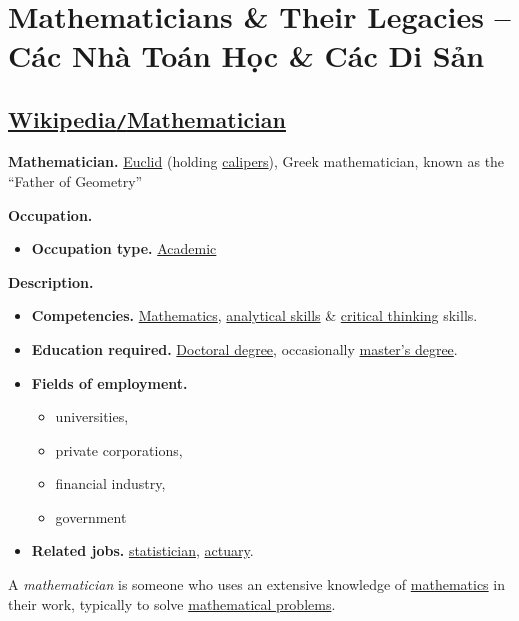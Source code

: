 \documentclass{article}
\begin{document}

\section{Mathematicians \& Their Legacies -- Các Nhà Toán Học \& Các Di Sản}

\subsection{\href{https://en.wikipedia.org/wiki/Mathematician}{Wikipedia\texttt{/}Mathematician}}
\textbf{Mathematician.} \href{https://en.wikipedia.org/wiki/Euclid}{Euclid} (holding \href{https://en.wikipedia.org/wiki/Calipers}{calipers}), Greek mathematician, known as the ``Father of Geometry''

\noindent
\textbf{Occupation.}
\begin{itemize}
	\item \textbf{Occupation type.} \href{https://en.wikipedia.org/wiki/Academic}{Academic}
\end{itemize}
\textbf{Description.}
\begin{itemize}
	\item \textbf{Competencies.} \href{https://en.wikipedia.org/wiki/Mathematics}{Mathematics}, \href{https://en.wikipedia.org/wiki/Analytical_skill}{analytical skills} \& \href{https://en.wikipedia.org/wiki/Critical_thinking}{critical thinking} skills.
	\item \textbf{Education required.} \href{https://en.wikipedia.org/wiki/Doctoral_degree}{Doctoral degree}, occasionally \href{https://en.wikipedia.org/wiki/Master's_degree}{master's degree}.
	\item \textbf{Fields of employment.}
	\begin{itemize}
		\item universities,
		\item private corporations,
		\item financial industry,
		\item government
	\end{itemize}
	\item \textbf{Related jobs.} \href{https://en.wikipedia.org/wiki/Statistician}{statistician}, \href{https://en.wikipedia.org/wiki/Actuary}{actuary}.
\end{itemize}
A \textit{mathematician} is someone who uses an extensive knowledge of \href{https://en.wikipedia.org/wiki/Mathematics}{mathematics} in their work, typically to solve \href{https://en.wikipedia.org/wiki/Mathematical_problem}{mathematical problems}.
\end{document}
